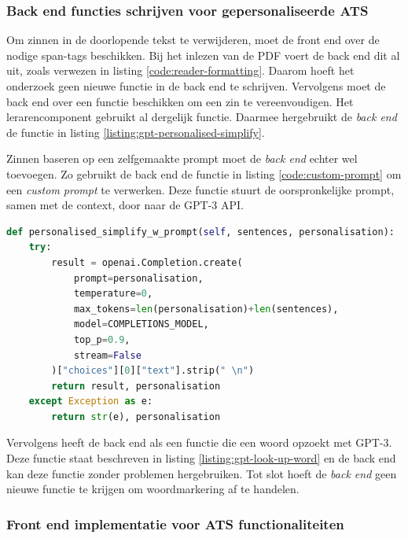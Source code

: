 \subsubsection{Back end functies schrijven voor gepersonaliseerde ATS}

Om zinnen in de doorlopende tekst te verwijderen, moet de front end over de nodige span-tags beschikken. Bij het inlezen van de PDF voert de back end dit al uit, zoals verwezen in listing \ref{code:reader-formatting}. Daarom hoeft het onderzoek geen nieuwe functie in de back end te schrijven. Vervolgens moet de back end over een functie beschikken om een zin te vereenvoudigen. Het lerarencomponent gebruikt al dergelijk functie. Daarmee hergebruikt de \textit{back end} de functie in listing \ref{listing:gpt-personalised-simplify}. 

\medspace

Zinnen baseren op een zelfgemaakte prompt moet de \textit{back end} echter wel toevoegen. Zo gebruikt de back end de functie in listing \ref{code:custom-prompt} om een \textit{custom prompt} te verwerken. Deze functie stuurt de oorspronkelijke prompt, samen met de context, door naar de GPT-3 API.

\begin{lstlisting}[language=python, caption={Een API-call sturen naar GPT-3 met een custom prompt.}, label={code:custom-prompt}]
def personalised_simplify_w_prompt(self, sentences, personalisation):
	try:
		result = openai.Completion.create(
			prompt=personalisation,
			temperature=0,
			max_tokens=len(personalisation)+len(sentences),
			model=COMPLETIONS_MODEL,
			top_p=0.9,
			stream=False
		)["choices"][0]["text"].strip(" \n")
		return result, personalisation
	except Exception as e:
		return str(e), personalisation
\end{lstlisting}


Vervolgens heeft de back end als een functie die een woord opzoekt met GPT-3. Deze functie staat beschreven in listing \ref{listing:gpt-look-up-word} en de back end kan deze functie zonder problemen hergebruiken. Tot slot hoeft de \textit{back end} geen nieuwe functie te krijgen om woordmarkering af te handelen.

\subsubsection{Front end implementatie voor ATS functionaliteiten}


